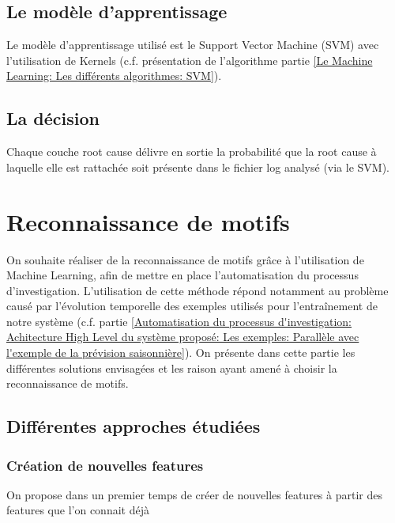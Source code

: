 \subsection{Le modèle d'apprentissage}
\label{Automatisation du processus d'investigation: Achitecture High Level du système proposé: Le modèle d'apprentissage}
Le modèle d'apprentissage utilisé est le Support Vector Machine (SVM) avec l'utilisation de Kernels (c.f. présentation de l'algorithme partie \ref{Le Machine Learning: Les différents algorithmes: SVM}).


\subsection{La décision}
\label{Automatisation du processus d'investigation: Achitecture High Level du système proposé: La décision}
Chaque couche root cause délivre en sortie la probabilité que la root cause à laquelle elle est rattachée soit présente dans le fichier log analysé (via le SVM).



\section{Reconnaissance de motifs}
\label{Automatisation du processus d'investigation: Reconnaissance de motifs}
On souhaite réaliser de la reconnaissance de motifs grâce à l'utilisation de Machine Learning, afin de mettre en place l'automatisation du processus d'investigation. L'utilisation de cette méthode répond notamment au problème causé par l'évolution temporelle des exemples utilisés pour l'entraînement de notre système (c.f. partie \ref{Automatisation du processus d'investigation: Achitecture High Level du système proposé: Les exemples: Parallèle avec l'exemple de la prévision saisonnière}). On présente dans cette partie les différentes solutions envisagées et les raison ayant amené à choisir la reconnaissance de motifs. 

\subsection{Différentes approches étudiées}
\label{Automatisation du processus d'investigation: Reconnaissance de motifs: Différentes approches étudiées}

\subsubsection{Création de nouvelles features}
\label{Automatisation du processus d'investigation: Reconnaissance de motifs: Différentes approches étudiées: Création de nouvelles features}
On propose dans un premier temps de créer de nouvelles features à partir des features que l'on connait déjà

